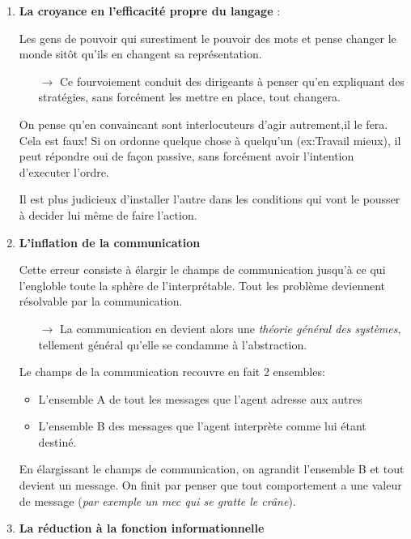 \documentclass[11pt]{article} %
\begin{document}
\begin{enumerate}
\item \textbf{La croyance en l'efficacité propre du langage} :

    Les gens de pouvoir qui surestiment le pouvoir des mots et pense
    changer le monde sitôt qu'ils en changent sa représentation. 
    \begin{itemize}
        \item[$\to$] Ce fourvoiement conduit des dirigeants à penser qu'en expliquant des
    stratégies, sans forcément les mettre en place, tout changera.
    \end{itemize}

    On pense qu'en convaincant sont interlocuteurs d'agir autrement,il
    le fera. Cela est faux! Si on ordonne quelque chose à quelqu'un
    (ex:Travail mieux), il peut répondre oui de façon passive, sans
    forcément avoir l'intention d'executer l'ordre.

    Il est plus judicieux d'installer l'autre dans les conditions qui
    vont le pousser à decider lui même de faire l'action.


\item \textbf{L'inflation de la communication}

    Cette erreur consiste à élargir le champs de communication
    jusqu'à ce qui l'engloble toute la sphère de l'interprétable.
    Tout les problème deviennent résolvable par la communication.
    \begin{itemize}
        \item[$\to$] La communication en devient alors une \textit{théorie général des
    systèmes}, tellement général qu'elle se condamme à l'abstraction.
    \end{itemize}

    Le champs de la communication recouvre en fait 2 ensembles:

    \begin{itemize}
        \item L'ensemble A de tout les messages que l'agent adresse aux autres
        \item L'ensemble B des messages que l'agent interprète comme lui étant destiné. 
    \end{itemize}

    En élargissant le champs de communication, on agrandit l'ensemble B
    et tout devient un message. On finit par penser que tout comportement
    a une valeur de message (\textit{par exemple un mec qui se gratte le
    crâne}).

 \item \textbf{La réduction à la fonction informationnelle}


\end{enumerate}
\end{document}
